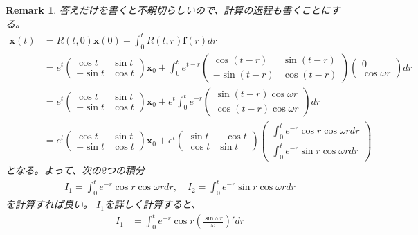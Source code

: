 \documentclass{jsarticle}
\newtheorem{remark}{Remark}
\begin{document}
\begin{remark}
答えだけを書くと不親切らしいので、計算の過程も書くことにする。
\begin{align}
\boldsymbol{x}(t)&=R(t,0)\boldsymbol{x}(0)
+\int_{0}^{t}R(t,r)\boldsymbol{f}(r)dr\\
&=e^{t}\left(
\begin{array}{cc}
\cos t & \sin t\\
-\sin t & \cos t
\end{array}\right)
\boldsymbol{x}_{0}
+\int_{0}^{t}e^{t-r}\left(
\begin{array}{cc}
\cos(t-r) & \sin(t-r)\\
-\sin(t-r) & \cos(t-r)
\end{array}
\right)
\left(
\begin{array}{c}
0\\
\cos\omega r
\end{array}\right)dr\\
&=e^{t}\left(
\begin{array}{cc}
\cos t & \sin t\\
-\sin t & \cos t
\end{array}\right)
\boldsymbol{x}_{0}
+e^{t}\int_{0}^{t}e^{-r}
\left(
\begin{array}{c}
\sin(t-r)\cos\omega r\\
\cos(t-r)\cos\omega r
\end{array}
\right)dr\\
&=e^{t}\left(
\begin{array}{cc}
\cos t & \sin t\\
-\sin t & \cos t
\end{array}\right)
\boldsymbol{x}_{0}
+e^{t}\left(
\begin{array}{cc}
\sin t & -\cos t\\
\cos t & \sin t
\end{array}
\right)
\left(
\begin{array}{c}
\int_{0}^{t}e^{-r}\cos r\cos\omega rdr\\
\int_{0}^{t}e^{-r}\sin r\cos\omega rdr
\end{array}\right)
\end{align}
となる。よって、次の2つの積分
\begin{align}
I_{1}=\int_{0}^{t}e^{-r}\cos r\cos\omega rdr,\quad
I_{2}=\int_{0}^{t}e^{-r}\sin r\cos\omega rdr
\end{align}
を計算すれば良い。
$I_{1}$を詳しく計算すると、
\begin{align}
I_{1}&=\int_{0}^{t}e^{-r}\cos r\left(\frac{\sin\omega r}{\omega}\right)'dr\\

\end{align}
\end{remark}
\end{document}
